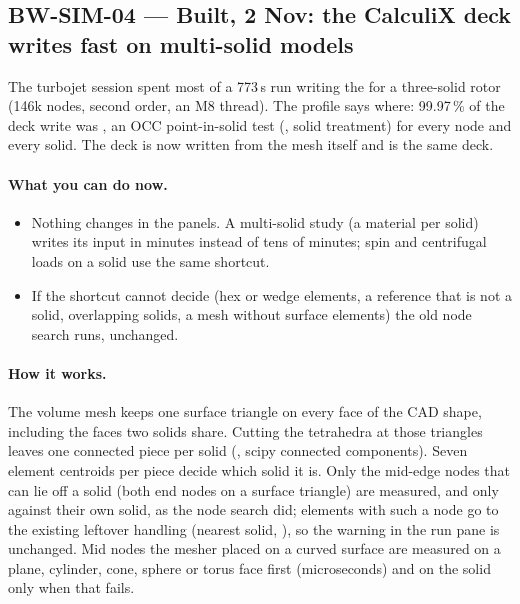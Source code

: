 \subsection{BW-SIM-04 --- Built, 2 Nov: the CalculiX deck writes fast on multi-solid models}\label{sec:sim-deck-built}

The turbojet session spent most of a 773\,s run writing the  for a three-solid rotor (146k nodes, second
order, an M8 thread). The profile says where: 99.97\,\% of the deck write was , an OCC
point-in-solid test (, solid treatment) for every node and every solid. The deck is now
written from the mesh itself and is the same deck.

\paragraph{What you can do now.}
\begin{itemize}[nosep]
  \item Nothing changes in the panels. A multi-solid study (a material per solid) writes its input in minutes
        instead of tens of minutes; spin and centrifugal loads on a solid use the same shortcut.
  \item If the shortcut cannot decide (hex or wedge elements, a reference that is not a solid, overlapping solids, a mesh
        without surface elements) the old node search runs, unchanged.
\end{itemize}

\paragraph{How it works.}
The volume mesh keeps one surface triangle on every face of the CAD shape, including the faces two solids share.
Cutting the tetrahedra at those triangles leaves one connected piece per solid (, scipy
connected components). Seven element centroids per piece decide which solid it is. Only the mid-edge nodes that can lie
off a solid (both end nodes on a surface triangle) are measured, and only against their own solid, as the node search
did; elements with such a node go to the existing leftover handling (nearest solid, ), so the
warning in the run pane is unchanged. Mid nodes the mesher placed on a curved surface are measured on a plane, cylinder,
cone, sphere or torus face first (microseconds) and on the solid only when that fails.

